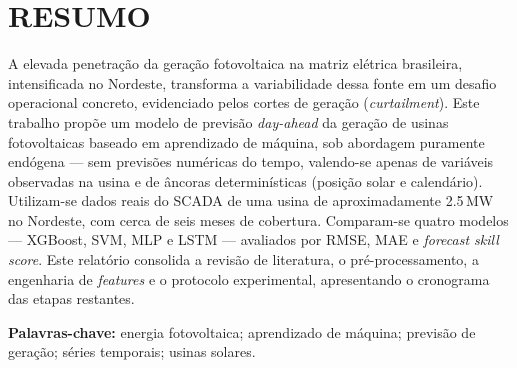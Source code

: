 \section*{RESUMO}

A elevada penetração da geração fotovoltaica na matriz elétrica brasileira, intensificada no Nordeste, transforma a variabilidade dessa fonte em um desafio operacional concreto, evidenciado pelos cortes de geração (\textit{curtailment}). Este trabalho propõe um modelo de previsão \textit{day-ahead} da geração de usinas fotovoltaicas baseado em aprendizado de máquina, sob abordagem puramente endógena — sem previsões numéricas do tempo, valendo-se apenas de variáveis observadas na usina e de âncoras determinísticas (posição solar e calendário). Utilizam-se dados reais do SCADA de uma usina de aproximadamente 2.5\,MW no Nordeste, com cerca de seis meses de cobertura. Comparam-se quatro modelos — XGBoost, SVM, MLP e LSTM — avaliados por RMSE, MAE e \textit{forecast skill score}. Este relatório consolida a revisão de literatura, o pré-processamento, a engenharia de \textit{features} e o protocolo experimental, apresentando o cronograma das etapas restantes.

\vspace{0.5cm}
\noindent\textbf{Palavras-chave:} energia fotovoltaica; aprendizado de máquina; previsão de geração; séries temporais; usinas solares.